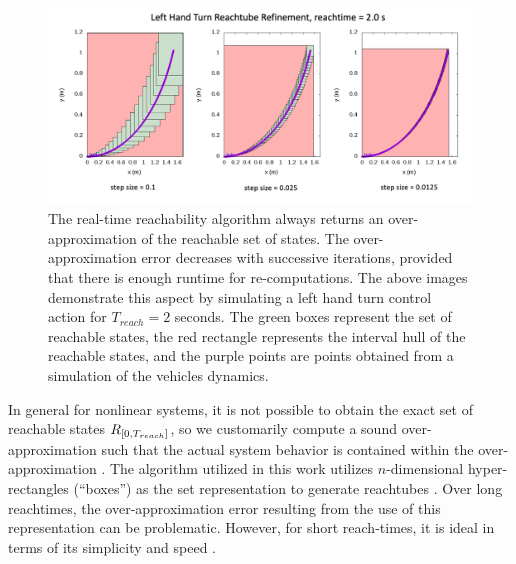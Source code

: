 \documentclass[manuscript,screen,review]{acmart}
\newcommand{\diego}[1]{\textcolor{purple}{\textbf{\underline{DM:}} #1}}
\begin{document}
\begin{figure}[htbp]%
  \centering
  \includegraphics[width=0.90\linewidth]{figures/refinement_cropped.pdf}
  \caption{The real-time reachability algorithm always returns an over-approximation of the reachable set of states. The over-approximation error decreases with successive iterations, provided that there is enough runtime for re-computations. The above images demonstrate this aspect by simulating a left hand turn control action for $T_{reach} = 2$ seconds. The green boxes represent the set of reachable states, the red rectangle represents the interval hull of the reachable states, and the purple points are points obtained from a simulation of the vehicles dynamics.}
  \label{fig:reach_refine}
\end{figure}%
In general for nonlinear systems, it is not possible to obtain the exact set of reachable states $\mathnormal{R}_{[0,T_{reach}]}$, so we customarily compute a sound over-approximation such that the actual system behavior is contained within the over-approximation \cite{AlthoffNonlinear,Lin2020,Asarin2003}. The algorithm utilized in this work utilizes $n$-dimensional hyper-rectangles (``boxes'') as the set representation to generate reachtubes \cite{Johnson2016}. Over long reachtimes, the over-approximation error resulting from the use of this representation can be problematic. However, for short reach-times, it is ideal in terms of its simplicity and speed \cite{Bak2014}. 
\end{document}
